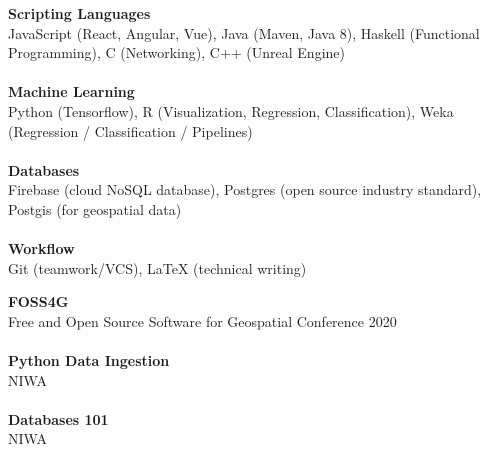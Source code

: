 \documentclass[9pt]{developercv}
\begin{document}


{
	{\textbf{Scripting Languages}}
	\\
	{JavaScript (React, Angular, Vue), Java (Maven, Java 8), Haskell (Functional Programming), C (Networking), C++ (Unreal Engine)}
	\\\\
}
{
	{\textbf{Machine Learning}}
	\\
	{Python (Tensorflow), R (Visualization, Regression, Classification), Weka (Regression / Classification / Pipelines) }
	\\\\
}
{
	{\textbf{Databases}}
	\\
	{Firebase (cloud NoSQL database), Postgres (open source industry standard), Postgis (for geospatial data)}
	\\\\
}
{
	{\textbf{Workflow}}
	\\
	{Git (teamwork/VCS), LaTeX (technical writing)}
}



{
	{\textbf{FOSS4G}}
	\\
	{Free and Open Source Software for Geospatial Conference 2020}
	\\\\
}
{
	{\textbf{Python Data Ingestion}}
	\\
	{NIWA}
	\\\\
}
{
	{\textbf{Databases 101}}
	\\
	{NIWA}
}

\end{document}
